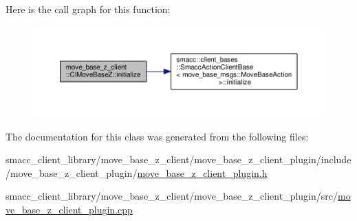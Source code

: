 Here is the call graph for this function\+:\nopagebreak
\begin{figure}[H]
\begin{center}
\leavevmode
\includegraphics[width=350pt]{classmove__base__z__client_1_1ClMoveBaseZ_a082cef8bf5dbd0ec06adfe2a7aefbf70_cgraph}
\end{center}
\end{figure}




The documentation for this class was generated from the following files\+:\begin{DoxyCompactItemize}
\item 
smacc\+\_\+client\+\_\+library/move\+\_\+base\+\_\+z\+\_\+client/move\+\_\+base\+\_\+z\+\_\+client\+\_\+plugin/include/move\+\_\+base\+\_\+z\+\_\+client\+\_\+plugin/\hyperlink{move__base__z__client__plugin_8h}{move\+\_\+base\+\_\+z\+\_\+client\+\_\+plugin.\+h}\item 
smacc\+\_\+client\+\_\+library/move\+\_\+base\+\_\+z\+\_\+client/move\+\_\+base\+\_\+z\+\_\+client\+\_\+plugin/src/\hyperlink{move__base__z__client__plugin_8cpp}{move\+\_\+base\+\_\+z\+\_\+client\+\_\+plugin.\+cpp}\end{DoxyCompactItemize}
